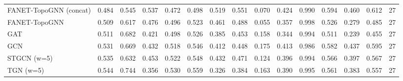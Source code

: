 \begin{tabular}{lrrrrrrrrrrrrrr}
FANET-TopoGNN (concat) & 0.484 & 0.545 & 0.537 & 0.472 & 0.498 & 0.519 & 0.551 & 0.070 & 0.424 & 0.990 & 0.594 & 0.460 & 0.612 & 27 \\
FANET-TopoGNN & 0.509 & 0.617 & 0.476 & 0.496 & 0.523 & 0.461 & 0.488 & 0.055 & 0.357 & 0.998 & 0.526 & 0.279 & 0.485 & 27 \\
GAT & 0.511 & 0.682 & 0.421 & 0.498 & 0.526 & 0.385 & 0.453 & 0.158 & 0.344 & 0.994 & 0.511 & 0.239 & 0.455 & 27 \\
GCN & 0.531 & 0.669 & 0.432 & 0.518 & 0.546 & 0.412 & 0.448 & 0.175 & 0.413 & 0.986 & 0.582 & 0.437 & 0.595 & 27 \\
STGCN (w=5) & 0.535 & 0.632 & 0.453 & 0.522 & 0.548 & 0.432 & 0.471 & 0.124 & 0.396 & 0.994 & 0.566 & 0.397 & 0.567 & 27 \\
TGN (w=5) & 0.544 & 0.744 & 0.356 & 0.530 & 0.559 & 0.326 & 0.384 & 0.163 & 0.390 & 0.995 & 0.561 & 0.383 & 0.557 & 27 \\
\bottomrule
\end{tabular}